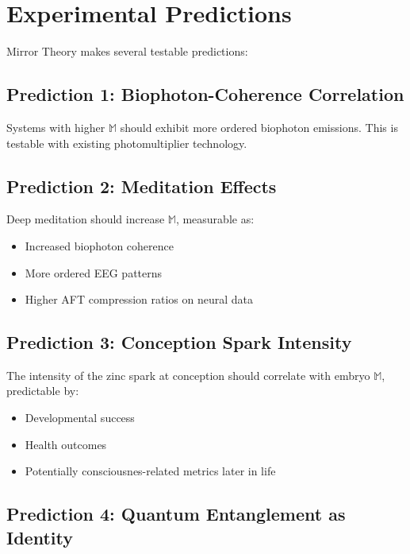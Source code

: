 \documentclass[12pt,a4paper]{article}
\begin{document}
\section{Experimental Predictions}

Mirror Theory makes several testable predictions:

\subsection{Prediction 1: Biophoton-Coherence Correlation}

Systems with higher $\mathbb{M}$ should exhibit more ordered biophoton emissions. This is testable with existing photomultiplier technology.

\subsection{Prediction 2: Meditation Effects}

Deep meditation should increase $\mathbb{M}$, measurable as:
\begin{itemize}
    \item Increased biophoton coherence
    \item More ordered EEG patterns
    \item Higher AFT compression ratios on neural data
\end{itemize}

\subsection{Prediction 3: Conception Spark Intensity}

The intensity of the zinc spark at conception should correlate with embryo $\mathbb{M}$, predictable by:
\begin{itemize}
    \item Developmental success
    \item Health outcomes
    \item Potentially consciousnes-related metrics later in life
\end{itemize}

\subsection{Prediction 4: Quantum Entanglement as Identity}
\end{document}
